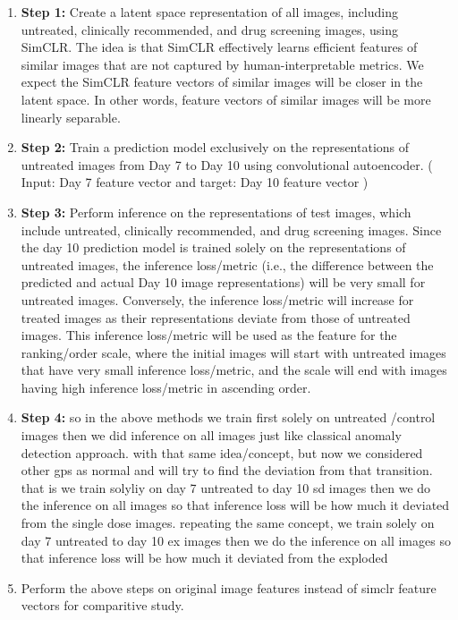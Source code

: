 \begin{enumerate}
    \item \textbf{Step 1:} Create a latent space representation of all images, including untreated, clinically recommended, 
    and drug screening images, using SimCLR. 
    The idea is that SimCLR effectively learns efficient features of similar images that are not captured by 
    human-interpretable metrics. We expect the SimCLR feature vectors of similar images will be closer in the latent space. 
    In other words, feature vectors of similar images will be more linearly separable.
  
  \item \textbf{Step 2:} Train a prediction model exclusively on the representations of 
  untreated images from Day 7 to Day 10 using convolutional autoencoder. ( Input: Day 7 feature vector and target: Day 10 feature vector )

  
  \item \textbf{Step 3:} Perform inference on the representations of test images, which include untreated, clinically recommended, and drug screening images.
  Since the day 10 prediction model is trained solely on the representations of untreated images, the inference loss/metric 
  (i.e., the difference between the predicted and actual Day 10 image representations) will be very small for untreated images.
   Conversely, the inference loss/metric will increase for treated images as their representations deviate from those of untreated images.
  This inference loss/metric will be used as the feature for the ranking/order scale, where the initial images will start 
  with untreated images that have very small inference loss/metric, and the scale will end with images having high inference loss/metric in ascending order. 
  
  \item \textbf{Step 4:} so in the above methods we train first solely on untreated /control images then we did inference on all images just like classical anomaly detection approach. 
  with that same idea/concept, but now we considered other gps as normal and will try to find the deviation from that transition. that is
  we train solyliy on day 7 untreated to day 10 sd images then we do the inference on all images so that inference loss will be how much it deviated from the single dose 
  images. repeating the same concept, we train solely on day 7 untreated to day 10 ex images then we do the inference on all images so that inference loss will be
   how much it deviated from the exploded
  \item Perform the above steps on original image features instead of simclr feature vectors for comparitive study.
\end{enumerate}



